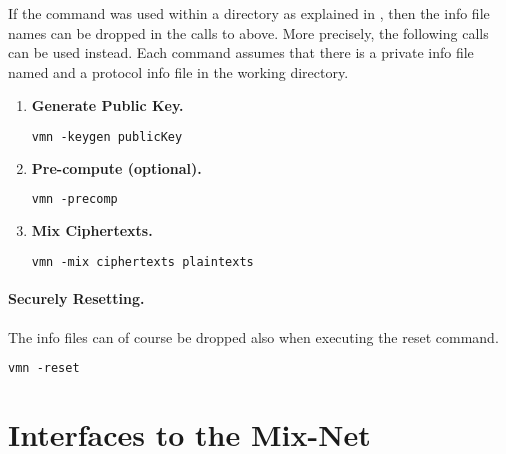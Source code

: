 \documentclass[11pt]{article}
\begin{document}
If the \vmni{} command was used within a directory as explained in
, then the info file names can be dropped in the calls
to \vmn{} above. More precisely, the following calls can be used
instead. Each command assumes that there is a private info file named
 and a protocol info file  in
the working directory.
\begin{enumerate}

\item\textbf{Generate Public Key.} 

\begin{lstlisting}[frame=single,language=xml,
basicstyle=\tt,showstringspaces=false]
vmn -keygen publicKey
\end{lstlisting}

\item\textbf{Pre-compute (optional).}

\begin{lstlisting}[frame=single,language=xml,
basicstyle=\tt,showstringspaces=false]
vmn -precomp
\end{lstlisting}

\item\textbf{Mix Ciphertexts.}

\begin{lstlisting}[frame=single,language=xml,
basicstyle=\tt,showstringspaces=false]
vmn -mix ciphertexts plaintexts
\end{lstlisting}

\end{enumerate}

\paragraph{Securely Resetting.}

The info files can of course be dropped also when executing the reset
command.

\vspace{0.3cm}
\begin{lstlisting}[frame=single,language=xml,
basicstyle=\tt,showstringspaces=false]
vmn -reset
\end{lstlisting}


\section{Interfaces to the Mix-Net}\label{sect:inter}
\end{document}
